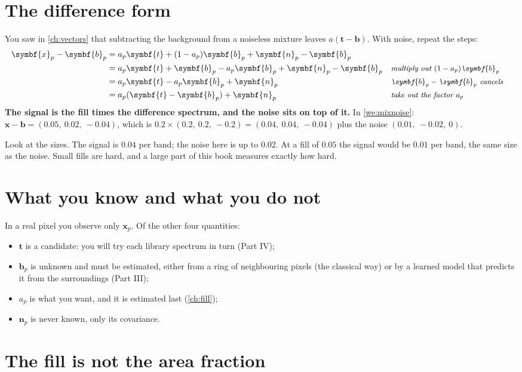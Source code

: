 \documentclass[11pt,a4paper,oneside,openany]{book}
\newcommand{\B}[1]{{\symbf{#1}}}
\newcommand{\B}[1]{{\bm{#1}}}
\newcommand{\vx}{\B{x}}
\newcommand{\vt}{\B{t}}
\newcommand{\vb}{\B{b}}
\newcommand{\vn}{\B{n}}
\newcommand{\why}[1]{&&\text{\small\itshape #1}}
\begin{document}
\section{The difference form}

You saw in \cref{ch:vectors} that subtracting the background from a noiseless mixture leaves $a(\vt-\vb)$. With noise, repeat the
steps:
\begin{align*}
\vx_p-\vb_p &= a_p\vt+(1-a_p)\vb_p+\vn_p-\vb_p\\
 &= a_p\vt+\vb_p-a_p\vb_p+\vn_p-\vb_p \why{multiply out $(1-a_p)\vb_p$}\\
 &= a_p\vt-a_p\vb_p+\vn_p \why{$\vb_p-\vb_p$ cancels}\\
 &= a_p(\vt-\vb_p)+\vn_p \why{take out the factor $a_p$}
\end{align*}
\textbf{The signal is the fill times the difference spectrum, and the noise sits on top of it.} In \cref{we:mixnoise}:
$\vx-\vb=(0.05,\ 0.02,\ -0.04)$, which is $0.2\times(0.2,\ 0.2,\ -0.2)=(0.04,\ 0.04,\ -0.04)$ plus the noise $(0.01,\ -0.02,\ 0)$.

Look at the sizes. The signal is $0.04$ per band; the noise here is up to $0.02$. At a fill of $0.05$ the signal would be $0.01$
per band, the same size as the noise. Small fills are hard, and a large part of this book measures exactly how hard.

\section{What you know and what you do not}

In a real pixel you observe only $\vx_p$. Of the other four quantities:
\begin{itemize}
\item $\vt$ is a candidate: you will try each library spectrum in turn (Part IV);
\item $\vb_p$ is unknown and must be estimated, either from a ring of neighbouring pixels (the classical way) or by a learned
  model that predicts it from the surroundings (Part III);
\item $a_p$ is what you want, and it is estimated last (\cref{ch:fill});
\item $\vn_p$ is never known, only its covariance.
\end{itemize}

\section{The fill is not the area fraction}
\end{document}
